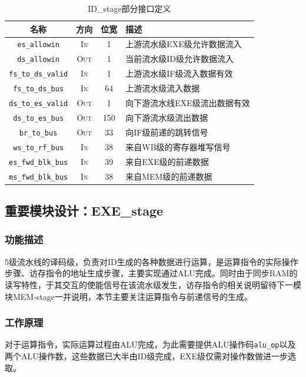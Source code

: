 \documentclass[UTF-8,twoside,c5size]{ctexart}
\begin{document}
	\begin{table}[!h]
		\centering
		\caption{ID\_stage部分接口定义}
		\begin{tabularx}{\textwidth}{|c|c|c|Y|}
			\hline
			\textbf{名称} & \textbf{方向} & \textbf{位宽} & \textbf{描述} \\
			\hline
			\texttt{es\_allowin} & \textsc{In} & 1 & 上游流水级EXE级允许数据流入 \\
			\hline
			\texttt{ds\_allowin} & \textsc{Out} & 1 & 当前流水级ID级允许数据流入 \\
			\hline
			\texttt{fs\_to\_ds\_valid} & \textsc{In} & 1 & 上游流水级IF级流入数据有效 \\
			\hline
			\texttt{fs\_to\_ds\_bus} & \textsc{In} & 64 & 上游流水级流入数据 \\
			\hline
			\texttt{ds\_to\_es\_valid} & \textsc{Out} & 1 & 向下游流水线EXE级流出数据有效 \\
			\hline
			\texttt{ds\_to\_es\_bus} & \textsc{Out} & 150 & 向下游流水级流出数据 \\
			\hline
			\texttt{br\_to\_bus} & \textsc{Out} & 33 & 向IF级前递的跳转信号 \\
			\hline
			\texttt{ws\_to\_rf\_bus} & \textsc{In} & 38 & 来自WB级的寄存器堆写信号 \\
			\hline
			\texttt{es\_fwd\_blk\_bus} & \textsc{In} & 39 & 来自EXE级的前递数据 \\
			\hline
			\texttt{ms\_fwd\_blk\_bus} & \textsc{In} & 38 & 来自MEM级的前递数据 \\
			\hline
		\end{tabularx}
	\end{table}
	
	\subsection{重要模块设计：EXE\_stage}
	\subsubsection{功能描述}
	5级流水线的译码级，负责对ID生成的各种数据进行运算，是运算指令的实际操作步骤、访存指令的地址生成步骤，主要实现通过ALU完成。同时由于同步RAM的读写特性，于其交互的使能信号在该流水级发生，访存指令的相关说明留待下一模块MEM-stage一并说明，本节主要关注运算指令与前递信号的生成。
	
	\subsubsection{工作原理}
	对于运算指令，实际运算过程由ALU完成，为此需要提供ALU操作码\texttt{alu\_op}以及两个ALU操作数，这些数据已大半由ID级完成，EXE级仅需对操作数做进一步选取。
	
\end{document}
